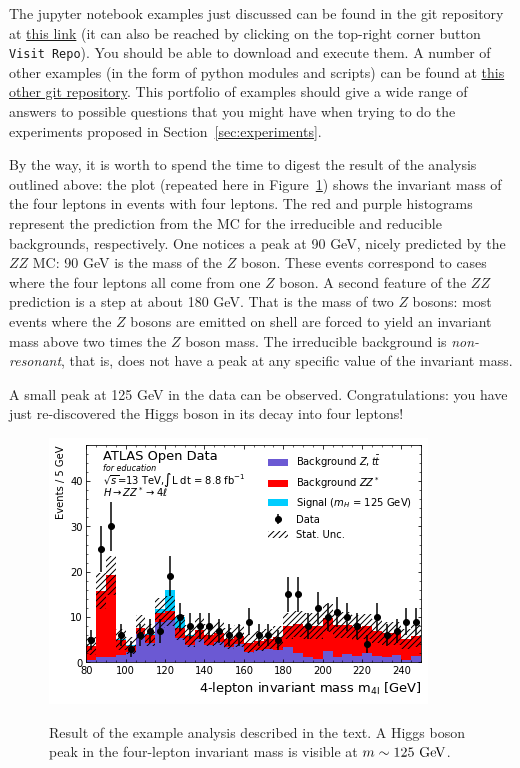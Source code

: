The jupyter notebook examples just discussed can be found in the git repository at \href{https://github.com/atlas-outreach-data-tools/notebooks-collection-opendata}{this link} (it can also be reached by clicking on the top-right corner button \verb|Visit Repo|). You should be able to download and execute them. A number of other examples (in the form of python modules and scripts) can be found at \href{https://github.com/atlas-outreach-data-tools/atlas-outreach-Python-uproot-framework-13tev}{this other git repository}. This portfolio of examples should give a wide range of answers to possible questions that you might have when trying to do the experiments proposed in Section~\ref{sec:experiments}. 

By the way, it is worth to spend the time to digest the result of the analysis outlined above: the plot (repeated here in Figure~\ref{fig:H_4lep}) shows the invariant mass of the four leptons in events with four leptons. The red and purple histograms represent the prediction from the MC for the irreducible and reducible backgrounds, respectively. One notices a peak at 90 GeV, nicely predicted by the $ZZ$ MC: 90 GeV is the mass of the $Z$ boson. These events correspond to cases where the four leptons all come from one $Z$ boson. A second feature of the $ZZ$ prediction is a step at about 180 GeV. That is the mass of two $Z$ bosons: most events where the $Z$ bosons are emitted on shell are forced to yield an invariant mass above two times the $Z$ boson mass. The irreducible background is \textit{non-resonant}, that is, does not have a peak at any specific value of the invariant mass.

A small peak at 125 GeV in the data can be observed. Congratulations: you have just re-discovered the Higgs boson in its decay into four leptons! 

\begin{figure}[tb] 
	\centering
	\includegraphics[width=0.5\columnwidth]{Figures/H_4lep.png}
	\label{fig:H_4lep}
	\caption{Result of the example analysis described in the text. A Higgs boson peak in the four-lepton invariant mass is visible at $ m \sim 125\ \text{Ge\kern -0.1em V}$.}
\end{figure}

